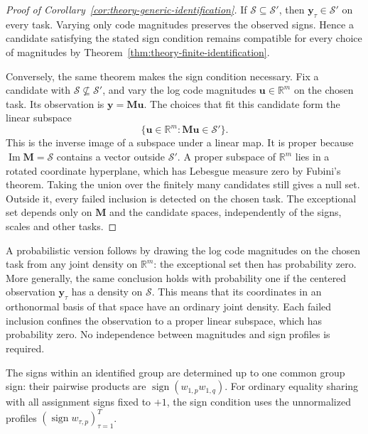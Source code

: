 \begin{proof}[Proof of Corollary~\ref{cor:theory-generic-identification}]
    If $\mathcal S\subseteq\mathcal S'$, then
    $\mathbf y_\tau\in\mathcal S'$ on every task. Varying only
    code magnitudes preserves the observed signs. Hence a candidate
    satisfying the stated sign condition remains compatible for
    every choice of magnitudes by Theorem~\ref{thm:theory-finite-identification}.

    Conversely, the same theorem makes the sign condition necessary.
    Fix a candidate with $\mathcal S\nsubseteq\mathcal S'$, and vary
    the log code magnitudes $\mathbf u\in\mathbb R^m$ on the chosen task.
    Its observation is $\mathbf y=\mathbf M\mathbf u$. The choices
    that fit this candidate form the linear subspace
    \begin{equation*}
        \{\mathbf u\in\mathbb R^m:\mathbf M\mathbf u\in\mathcal S'\}.
    \end{equation*}
    This is the inverse image of a subspace under a linear map.
    It is proper because $\operatorname{Im}\mathbf M=\mathcal S$
    contains a vector outside $\mathcal S'$. A proper subspace of
    $\mathbb R^m$ lies in a rotated coordinate hyperplane, which
    has Lebesgue measure zero by Fubini's theorem. Taking the union
    over the finitely many candidates still gives a null set.
    Outside it, every failed inclusion is detected on the chosen task.
    The exceptional set depends only on $\mathbf M$ and the candidate
    spaces, independently of the signs, scales and other tasks.

\end{proof}

A probabilistic version follows by drawing the log code magnitudes
on the chosen task from any joint density on $\mathbb R^m$:
the exceptional set then has probability zero. More generally,
the same conclusion holds with probability one if the centered
observation $\mathbf y_\tau$ has a density on $\mathcal S$.
This means that its coordinates in an orthonormal basis of that
space have an ordinary joint density. Each failed inclusion confines
the observation to a proper linear subspace, which has probability
zero. No independence between magnitudes and sign profiles is required.

The signs within an identified group are determined up to one
common group sign: their pairwise products are
$\operatorname{sign}(w_{1,p}w_{1,q})$.
For ordinary equality sharing with all assignment signs fixed
to $+1$, the sign condition uses the unnormalized profiles
$(\operatorname{sign}w_{\tau,p})_{\tau=1}^T$.

